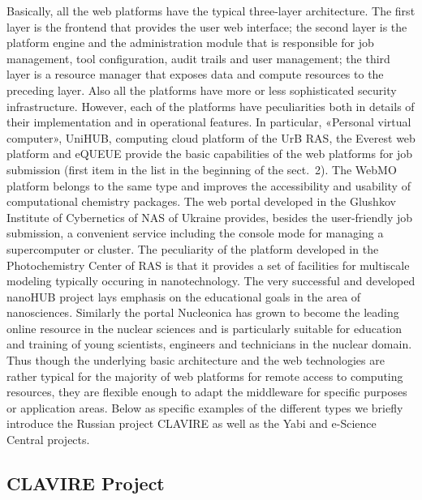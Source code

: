 \documentclass[procedia]{easychair}
\begin{document}
Basically, all the web platforms have the typical three-layer architecture. The first layer is the frontend that provides the user web interface; the second layer is the platform engine and the administration module that is responsible for job management, tool configuration, audit trails and user management; the third layer is a resource manager that exposes data and compute resources to the preceding layer. Also all the platforms have more or less sophisticated security infrastructure. However, each of the platforms have peculiarities both in details of their implementation and in operational features. In particular, «Personal virtual computer», UniHUB, computing cloud platform of the UrB RAS, the Everest web platform and eQUEUE provide the basic capabilities of the web platforms for job submission (first item in the list in the beginning of the sect. 2). The WebMO platform belongs to the same type and improves the accessibility and usability of  computational chemistry packages. The web portal developed in the Glushkov Institute of Cybernetics of NAS of Ukraine provides, besides the user-friendly job submission, a convenient service including the console mode for managing a supercomputer or cluster. The peculiarity of the platform developed in the Photochemistry Center of RAS is that it provides a set of facilities for multiscale modeling typically occuring in nanotechnology.
The very successful and developed nanoHUB project lays emphasis on the educational goals in the area of nanosciences. Similarly the portal Nucleonica has grown to become the leading online resource in the nuclear sciences and is particularly suitable for education and training of young scientists, engineers and technicians in the nuclear domain. 
Thus though the underlying basic architecture and the web technologies are rather typical for the majority of web platforms for remote access to computing resources, they are flexible enough to adapt the middleware for specific purposes or application areas.
Below as specific examples of the different types we briefly introduce the Russian project CLAVIRE as well as the Yabi and e-Science Central projects. 

\subsection{CLAVIRE Project}
\end{document}
